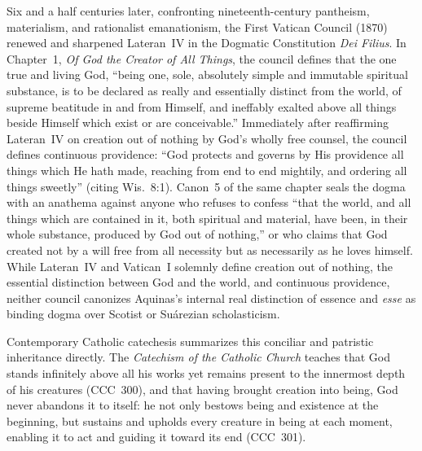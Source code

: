 Six and a half centuries later, confronting nineteenth-century pantheism, materialism, and rationalist emanationism, the First Vatican Council (1870) renewed and sharpened Lateran~IV in the Dogmatic Constitution \emph{Dei Filius}. In Chapter~1, \emph{Of God the Creator of All Things}, the council defines that the one true and living God, ``being one, sole, absolutely simple and immutable spiritual substance, is to be declared as really and essentially distinct from the world, of supreme beatitude in and from Himself, and ineffably exalted above all things beside Himself which exist or are conceivable.'' Immediately after reaffirming Lateran~IV on creation out of nothing by God's wholly free counsel, the council defines continuous providence: ``God protects and governs by His providence all things which He hath made, reaching from end to end mightily, and ordering all things sweetly'' (citing Wis.\ 8:1). Canon~5 of the same chapter seals the dogma with an anathema against anyone who refuses to confess ``that the world, and all things which are contained in it, both spiritual and material, have been, in their whole substance, produced by God out of nothing,'' or who claims that God created not by a will free from all necessity but as necessarily as he loves himself. While Lateran~IV and Vatican~I solemnly define creation out of nothing, the essential distinction between God and the world, and continuous providence, neither council canonizes Aquinas's internal real distinction of essence and \emph{esse} as binding dogma over Scotist or Su\'{a}rezian scholasticism.

Contemporary Catholic catechesis summarizes this conciliar and patristic inheritance directly. The \emph{Catechism of the Catholic Church} teaches that God stands infinitely above all his works yet remains present to the innermost depth of his creatures (CCC~300), and that having brought creation into being, God never abandons it to itself: he not only bestows being and existence at the beginning, but sustains and upholds every creature in being at each moment, enabling it to act and guiding it toward its end (CCC~301).
